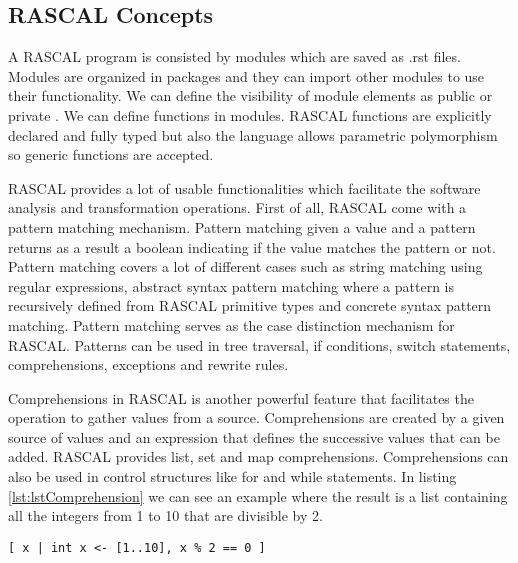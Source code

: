\subsection{RASCAL Concepts}
A RASCAL program is consisted by modules which are saved as .rst files. Modules are organized in packages and they can import other modules to use their functionality. We can define the visibility of module elements as public or private . We can define functions in modules. RASCAL functions are explicitly declared and fully typed but also the language allows parametric polymorphism so generic functions are accepted\cite{rascalOrigin}.

RASCAL provides a lot of usable functionalities which facilitate the software analysis and transformation operations. First of all, RASCAL come with a pattern matching mechanism. Pattern matching given a value and a pattern returns as a result a boolean indicating if the value matches the pattern or not. Pattern matching covers a lot of different cases such as string matching using regular expressions, abstract syntax pattern matching where a pattern is recursively defined from RASCAL primitive types and concrete syntax pattern matching. Pattern matching serves as the case distinction mechanism for RASCAL. Patterns can be used in tree traversal, if conditions, switch statements, comprehensions, exceptions and rewrite rules.

Comprehensions in RASCAL is another powerful feature that facilitates the operation to gather values from a source. Comprehensions are created by a given source of values and an expression that defines the successive values that can be added. RASCAL provides list, set and map comprehensions. Comprehensions can also be used in control structures like for and while statements. In listing \ref{lst:lstComprehension} we can see an example where the result is a list containing all the integers from 1 to 10 that are divisible by 2.

\begin{lstlisting}[caption={List Comprehensions in Rascal},label={lst:lstComprehension}]
[ x | int x <- [1..10], x % 2 == 0 ]
\end{lstlisting}


